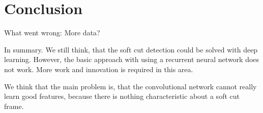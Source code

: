 \section{Conclusion}
\label{sec:conclusion}

What went wrong:
More data?

In summary.
We still think, that the soft cut detection could be solved with deep learning.
However, the basic approach with using a recurrent neural network does not work.
More work and innovation is required in this area.

We think that the main problem is, that the convolutional network cannot really learn good features, because there is nothing characteristic about a soft cut frame.
